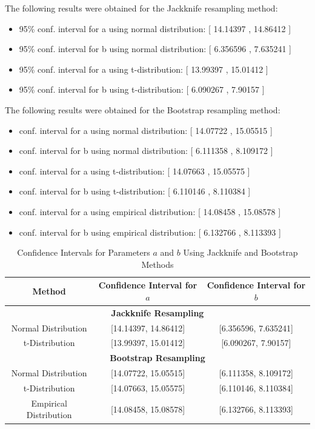 \documentclass[]{article}
\begin{document}
\noindent The following results were obtained for the Jackknife resampling method:

\begin{itemize}
	\item 95\% conf. interval for a using normal distribution: [ 14.14397 , 14.86412 ]
	\item 95\% conf. interval for b using normal distribution: [ 6.356596 , 7.635241 ]
	\item 95\% conf. interval for a using t-distribution: [ 13.99397 , 15.01412 ]
	\item 95\% conf. interval for b using t-distribution: [ 6.090267 , 7.90157 ]
\end{itemize}


\noindent The following results were obtained for the Bootstrap resampling method:

\begin{itemize}
	\item conf. interval for a using normal distribution: [ 14.07722 , 15.05515 ]
	\item conf. interval for b using normal distribution: [ 6.111358 , 8.109172 ]
	\item conf. interval for a using t-distribution: [ 14.07663 , 15.05575 ]
	\item conf. interval for b using t-distribution: [ 6.110146 , 8.110384 ]
	\item conf. interval for a using empirical distribution: [ 14.08458 , 15.08578 ]
	\item conf. interval for b using empirical distribution: [ 6.132766 , 8.113393 ]
\end{itemize}

\begin{table}[h]
	\centering
	\begin{tabular}{|c|c|c|}
		\hline
		\textbf{Method} & \textbf{Confidence Interval for $a$} & \textbf{Confidence Interval for $b$} \\
		\hline
		\multicolumn{3}{|c|}{\textbf{Jackknife Resampling}} \\
		\hline
		Normal Distribution & [14.14397, 14.86412] & [6.356596, 7.635241] \\
		t-Distribution & [13.99397, 15.01412] & [6.090267, 7.90157] \\
		\hline
		\multicolumn{3}{|c|}{\textbf{Bootstrap Resampling}} \\
		\hline
		Normal Distribution & [14.07722, 15.05515] & [6.111358, 8.109172] \\
		t-Distribution & [14.07663, 15.05575] & [6.110146, 8.110384] \\
		Empirical Distribution & [14.08458, 15.08578] & [6.132766, 8.113393] \\
		\hline
	\end{tabular}
	\caption{Confidence Intervals for Parameters \( a \) and \( b \) Using Jackknife and Bootstrap Methods}
	\label{tab:ci_results}
\end{table}





\end{document}
